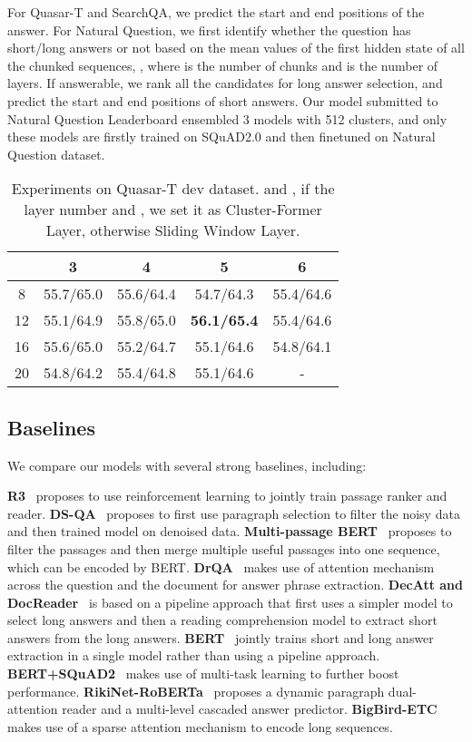 For Quasar-T and SearchQA, we predict the start and end positions of the answer.
For Natural Question, we first identify whether the question has short/long answers or not based on the mean values of the first hidden state of all the chunked sequences, , where  is the number of chunks and  is the number of layers. 
If answerable, we rank all the candidates for long answer selection, and predict the start and end positions of short answers.
Our model submitted to Natural Question Leaderboard ensembled 3 models with 512 clusters, and only these models are firstly trained on SQuAD2.0 and then finetuned on Natural Question dataset.
\begin{table}
\setlength{\tabcolsep}{4.3pt}
\centering
\begin{tabular}{ccccc}
\toprule
   & 3         & 4         & 5         & 6         \\
 \midrule
8  & 55.7/65.0 & 55.6/64.4 & 54.7/64.3 & 55.4/64.6 \\
12 & 55.1/64.9 & 55.8/65.0 & \textbf{56.1/65.4} & 55.4/64.6 \\
16 & 55.6/65.0 & 55.2/64.7 & 55.1/64.6 & 54.8/64.1 \\
20 & 54.8/64.2 & 55.4/64.8 & 55.1/64.6 & -   \\     \bottomrule
\end{tabular}
\caption{Experiments on Quasar-T dev dataset.  and , if the layer number  and , we set it as Cluster-Former Layer, otherwise Sliding Window Layer. }
\label{tbl:cf_layers}
\end{table}

\subsection{Baselines}
We compare our models with several strong baselines, including:


\textbf{R3}~\citep{wang2018r} proposes to use reinforcement learning to jointly train passage ranker and reader.
\textbf{DS-QA}~\citep{lin2018denoising} proposes to first use paragraph selection to filter the noisy data and then trained model on denoised data.
\textbf{Multi-passage BERT}~\citep{wang2019multi} proposes to filter the passages and then merge multiple useful passages into one sequence, which can be encoded by BERT.
\textbf{DrQA}~\citep{chen2017reading} makes use of attention mechanism across the question and the document for answer phrase extraction.
\textbf{DecAtt and DocReader}~\citep{kwiatkowski2019natural} is based on a pipeline approach that first uses a simpler model to select long answers and then a reading comprehension model to extract short answers from the long answers.
\textbf{BERT}~\citep{alberti2019bert} jointly trains short and long answer extraction in a single model rather than using a pipeline approach.
\textbf{BERT+SQuAD2}~\citep{pan2019frustratingly} makes use of multi-task learning to further boost performance.
\textbf{RikiNet-RoBERTa}~\citep{liu2020rikinet} proposes a dynamic paragraph dual-attention reader and a multi-level
cascaded answer predictor.
\textbf{BigBird-ETC}~\citep{zaheer2020big} makes use of a sparse attention mechanism to encode long sequences.

